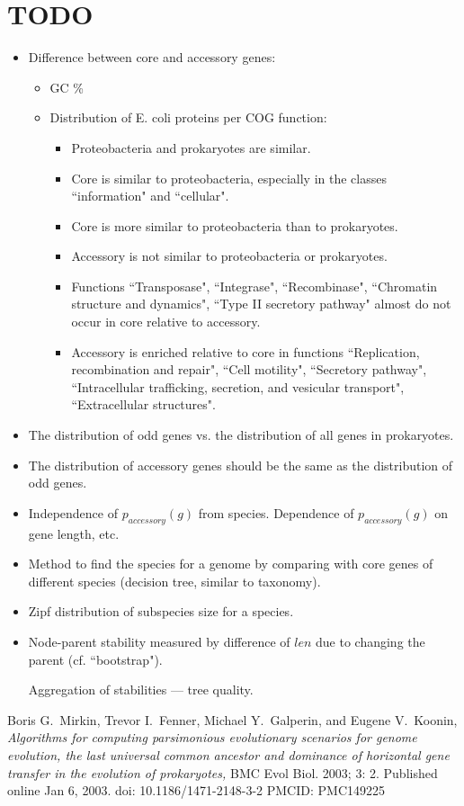 \documentclass[10pt,a4paper]{article}
\theoremstyle{plain} \newtheorem{Lem}{Lemma}
\begin{document}
\section{TODO}

\begin{itemize}
  \item Difference between core and accessory genes:
    \begin{itemize}
   	  \item GC \%
	  \item Distribution of E. coli proteins per COG function:
	  \begin{itemize}
    	  \item Proteobacteria and prokaryotes are similar.
    	  \item Core is similar to proteobacteria, especially in the classes ``information" and ``cellular".
    	  \item Core is more similar to proteobacteria than to prokaryotes.
    	  \item Accessory is not similar to proteobacteria or prokaryotes.
    	  \item Functions ``Transposase", ``Integrase", ``Recombinase", ``Chromatin structure and dynamics", ``Type II secretory pathway" almost do not occur in core relative to accessory.
    	  \item Accessory is enriched relative to core in functions ``Replication, recombination and repair", ``Cell motility", ``Secretory pathway", ``Intracellular trafficking, secretion, and vesicular transport", ``Extracellular structures".
	  \end{itemize}
    \end{itemize}
 	\item The distribution of odd genes vs. the distribution of all genes in prokaryotes.
 	\item The distribution of accessory genes should be the same as the distribution of odd genes.
 	\item Independence of $p_{accessory}(g)$ from species. Dependence of $p_{accessory}(g)$ on gene length, etc.
	\item Method to find the species for a genome by comparing with core genes of different species (decision tree, similar to taxonomy).
    \item Zipf distribution of subspecies size for a species.
    \item Node-parent stability measured by difference of $len$ due to changing the parent (cf. ``bootstrap").
          \par Aggregation of stabilities --- tree quality.
\end{itemize}


\begin{thebibliography}{9}

Boris G.~Mirkin, Trevor I.~Fenner, Michael Y.~Galperin, and Eugene V.~Koonin,
\emph{Algorithms for computing parsimonious evolutionary scenarios for genome evolution, the last universal common ancestor and dominance of horizontal gene transfer in the evolution of prokaryotes,}
BMC Evol Biol. 2003; 3: 2.
Published online Jan 6, 2003. doi:  10.1186/1471-2148-3-2
PMCID: PMC149225

\end{thebibliography}
\end{document}

